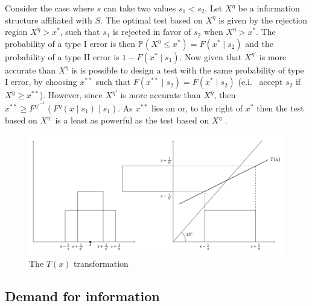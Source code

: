 \documentclass[10pt,a4paper]{article} %
\begin{document}
\begin{example}
Consider the case where $s$ can take two values $s_{1}<s_{2}$. Let $X^{\eta}$ be a information structure affiliated with $S$. The optimal test based on $X^{\eta}$ is given by the rejection region $X^{\eta}>x^{*}$, such that $s_{1}$ is rejected in favor of $s_{2}$ when $X^{\eta}>x^{*}$. The probability of a type I error is then $\mathbb{P}(X^{\eta}\le x^{*})=F(x^{*}\mid s_{2})$ and the probability of a type II error is $1-F(x^{*}\mid s_{1})$. Now given that $X^{\eta'}$ is more accurate than $X^{\eta}$ is is possible to design a test with the same probability of type I error, by choosing $x^{**}$ such that $F(x^{**}\mid s_{2})=F(x^{*}\mid s_{2})$ (e.i. \ accept $s_{2}$ if $X^{\eta}\ge x^{**}$). However, since $X^{\eta'}$ is more accurate than $X^{\eta}$, then $x^{**}\ge F^{\eta'^{-1}}(F^{\eta}(x\mid s_{1})\mid s_{1})$. As $x^{**}$ lies on or, to the right of $x^{*}$ then the test based on $X^{\eta'}$ is a least as powerful as the test based on $X^{\eta}$
\citep{Lehmann1988,Persico2000}.

\begin{figure}
\includegraphics[width=\textwidth]{../fig/t-transformation.pdf}
\protect\caption{The $T(x)$ transformation}
\end{figure}

\end{example}


\subsection{Demand for information}
\end{document}
